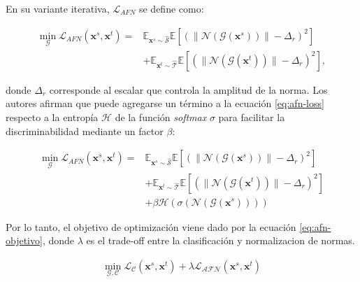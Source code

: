 En su variante iterativa, $\mathcal{L}_{AFN}$ se define como:

\begin{align}
  \min_{\mathcal{G}} \mathcal{L}_{AFN}(\mathbf{x}^s, \mathbf{x}^t) = & \mathbb{E}_{\mathbf{x}^s \sim \mathcal{\hat{S}}} \mathbb{E}[(\| \mathcal{N}(\mathcal{G}(\mathbf{x}^s)) \| - \Delta_r)^2] \nonumber \\
                                                                     & + \mathbb{E}_{\mathbf{x}^t \sim \mathcal{\hat{T}}} \mathbb{E}[(\| \mathcal{N}(\mathcal{G}(\mathbf{x}^t)) \| - \Delta_r)^2],
  \label{eq:afn-loss}
\end{align}

\noindent
donde $\Delta_r$ corresponde al escalar que controla la amplitud de la norma. Los autores afirman que puede agregarse
un término a la ecuación \ref{eq:afn-loss} respecto a la entropía $\mathcal{H}$ de la función {\it softmax} $\sigma$
para facilitar la discriminabilidad mediante un factor $\beta$:

\begin{align}
  \min_{\mathcal{G}} \mathcal{L}_{AFN}(\mathbf{x}^s, \mathbf{x}^t) = & \mathbb{E}_{\mathbf{x}^s \sim \mathcal{\hat{S}}} \mathbb{E}[(\| \mathcal{N}(\mathcal{G}(\mathbf{x}^s)) \| - \Delta_r)^2] \nonumber   \\
                                                                     & + \mathbb{E}_{\mathbf{x}^t \sim \mathcal{\hat{T}}} \mathbb{E}[(\| \mathcal{N}(\mathcal{G}(\mathbf{x}^t)) \| - \Delta_r)^2] \nonumber \\
                                                                     & + \beta \mathcal{H}(\sigma(\mathcal{N}(\mathcal{G}(\mathbf{x}^s)) ))
  \label{eq:afn-loss-entropy}
\end{align}

Por lo tanto, el objetivo de optimización viene dado por la ecuación \ref{eq:afn-objetivo}, donde $\lambda$ es el
trade-off entre la clasificación y normalizacion de normas.

\begin{align}
  \min_{\mathcal{G}, \mathcal{C}} \mathcal{L}_{\mathcal{C}}(\mathbf{x}^s, \mathbf{x}^t) + \lambda \mathcal{L}_{\mathcal{AFN}}(\mathbf{x}^s, \mathbf{x}^t)
  \label{eq:afn-objetivo}
\end{align}